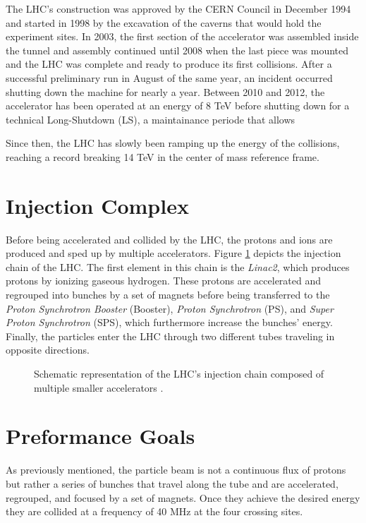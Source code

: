   The LHC's construction was approved by the CERN Council in December 1994 and started in 1998 by the excavation of the caverns that would hold the experiment sites. In 2003, the first section of the accelerator was assembled inside the tunnel and assembly continued until 2008 when the last piece was mounted and the LHC was complete and ready to produce its first collisions. After a successful preliminary run in August of the same year, an incident occurred shutting down the machine for nearly a year. Between 2010 and 2012, the accelerator has been operated at an energy of 8 TeV before shutting down for a technical Long-Shutdown (LS), a maintainance periode that allows 

  Since then, the LHC has slowly been ramping up the energy of the collisions, reaching a record breaking 14 TeV in the center of mass reference frame.

  \section{Injection Complex}

		Before being accelerated and collided by the LHC, the protons and ions are produced and sped up by multiple accelerators. Figure \ref{fig:lhc_and_cms__lhc_injection_chain} depicts the injection chain of the LHC. The first element in this chain is the \emph{Linac2}, which produces protons by ionizing gaseous hydrogen. These protons are accelerated and regrouped into bunches by a set of magnets before being transferred to the \emph{Proton Synchrotron Booster} (Booster), \emph{Proton Synchrotron} (PS), and \emph{Super Proton Synchrotron} (SPS), which furthermore increase the bunches' energy. Finally, the particles enter the LHC through two different tubes traveling in opposite directions.

		\begin{figure}[h!]
			\centering
			\caption{Schematic representation of the LHC's injection chain composed of multiple smaller accelerators \Cite{Fig_LHC_Chain}.}
			\label{fig:lhc_and_cms__lhc_injection_chain}
		\end{figure}

	\section{Preformance Goals}

  	As previously mentioned, the particle beam is not a continuous flux of protons but rather a series of bunches that travel along the tube and are accelerated, regrouped, and focused by a set of magnets. Once they achieve the desired energy they are collided at a frequency of 40 MHz at the four crossing sites. \\


